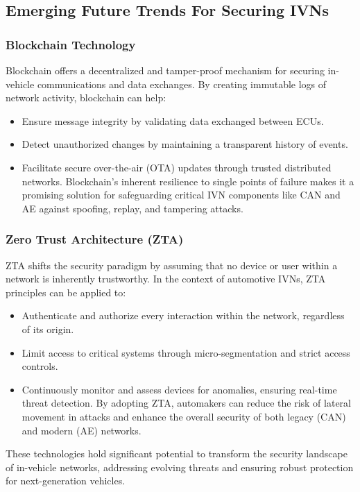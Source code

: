 \documentclass{report}
\begin{document}
\subsection{Emerging Future Trends For Securing IVNs}

\subsubsection{Blockchain Technology}
Blockchain offers a decentralized and tamper-proof mechanism for securing in-vehicle communications and data exchanges.\cite{khatri2021security} By creating immutable logs of network activity, blockchain can help:
\begin{itemize}
    \item Ensure message integrity by validating data exchanged between ECUs.
    \item Detect unauthorized changes by maintaining a transparent history of events.
    \item Facilitate secure over-the-air (OTA) updates through trusted distributed networks. Blockchain's inherent resilience to single points of failure makes it a promising solution for safeguarding critical IVN components like CAN and AE against spoofing, replay, and tampering attacks.

\end{itemize}

\subsubsection{Zero Trust Architecture (ZTA)}
ZTA shifts the security paradigm by assuming that no device or user within a network is inherently trustworthy. In the context of automotive IVNs, ZTA principles can be applied to:
\begin{itemize}
    \item Authenticate and authorize every interaction within the network, regardless of its origin.
    \item Limit access to critical systems through micro-segmentation and strict access controls.
    \item Continuously monitor and assess devices for anomalies, ensuring real-time threat detection. By adopting ZTA, automakers can reduce the risk of lateral movement in attacks and enhance the overall security of both legacy (CAN) and modern (AE) networks.

\end{itemize}

These  technologies hold significant potential to transform the security landscape of in-vehicle networks, addressing evolving threats and ensuring robust protection for next-generation vehicles.
\end{document}
